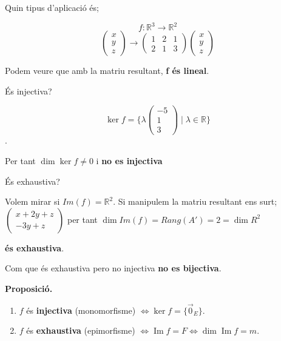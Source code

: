 \documentclass[12pt]{article}
\newcommand{\R}{\mathbb{R}}
\begin{document}
\begin{examplebox}{}
    Quin tipus d'aplicació és;

    \[f: \R^3 \rightarrow \R^2\]
    \[\begin{pmatrix}
        x\\
        y\\
        z
    \end{pmatrix} \rightarrow \begin{pmatrix}
        1 & 2 & 1\\
        2 & 1 & 3
    \end{pmatrix}\begin{pmatrix}
        x\\
        y\\
        z
    \end{pmatrix}\]

    Podem veure que amb la matriu resultant, \textbf{f és lineal}.

    És injectiva?

    \[\ker f = \{\lambda\begin{pmatrix}
    -5\\
    1\\
    3
    \end{pmatrix}\mid \lambda\in\R\}\].

    Per tant $\dim \ker f \neq 0$ i \textbf{no es injectiva}

    És exhaustiva?

    Volem mirar si $Im(f) = \R^2$. Si manipulem la matriu resultant ens surt; $\begin{pmatrix}
        x + 2y + z\\
        -3y + z
    \end{pmatrix}$ per tant $\dim Im(f) = Rang(A') = 2 = \dim R^2$

    \textbf{és exhaustiva}.

    Com que és exhaustiva pero no injectiva \textbf{no es bijectiva}.

\end{examplebox}

\noindent\textbf{Proposició.}
\begin{enumerate}
    \item $f$ és \textbf{injectiva} (monomorfisme) $\iff \ker f=\{\vec{0}_E\}$.
    \item $f$ és \textbf{exhaustiva} (epimorfisme) $\iff \operatorname{Im} f=F \iff \dim\operatorname{Im} f=m$.
\end{enumerate}
 
\end{document}
